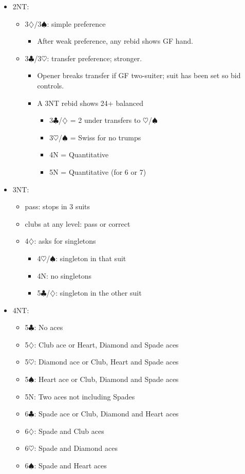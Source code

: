 \documentclass[a4paper,12pt]{article}
\begin{document}
\begin{itemize}
\item 2NT:
	\begin{itemize}
   \item 3$\diamondsuit$/3$\spadesuit$: simple preference
		\begin{itemize}
      \item After weak preference, any rebid shows GF hand.
		\end{itemize}
   \item 3$\clubsuit$/3$\heartsuit$: transfer preference; stronger.
		\begin{itemize}
      \item Opener breaks transfer if GF two-suiter; suit has been set so bid controls.
      \item A 3NT rebid shows 24+ balanced
			\begin{itemize}
         \item 3$\clubsuit$/$\diamondsuit$ = 2 under transfers to $\heartsuit$/$\spadesuit$
         \item 3$\heartsuit$/$\spadesuit$ = Swiss for no trumps
         \item 4N = Quantitative
         \item 5N = Quantitative (for 6 or 7)
			\end{itemize}
		\end{itemize}
	\end{itemize}

\item 3NT:
	\begin{itemize}
	\item pass: stops in 3 suits
	\item clubs at any level: pass or correct
	\item 4$\diamondsuit$: asks for singletons
		\begin{itemize}
		\item 4$\heartsuit$/$\spadesuit$: singleton in that suit
		\item 4N: no singletons
		\item 5$\clubsuit$/$\diamondsuit$: singleton in the other suit
		\end{itemize}
	\end{itemize}

\newpage

\item 4NT:
	\begin{itemize}
	\item 5$\clubsuit$: No aces
	\item 5$\diamondsuit$: Club ace or Heart, Diamond and Spade aces
	\item 5$\heartsuit$: Diamond ace or Club, Heart and Spade aces
	\item 5$\spadesuit$: Heart ace or Club, Diamond and Spade aces
	\item 5N: Two aces not including Spades
	\item 6$\clubsuit$: Spade ace or Club, Diamond and Heart aces
	\item 6$\diamondsuit$: Spade and Club aces
	\item 6$\heartsuit$: Spade and Diamond aces
	\item 6$\spadesuit$: Spade and Heart aces
	\end{itemize}


\end{itemize}
\end{document}
